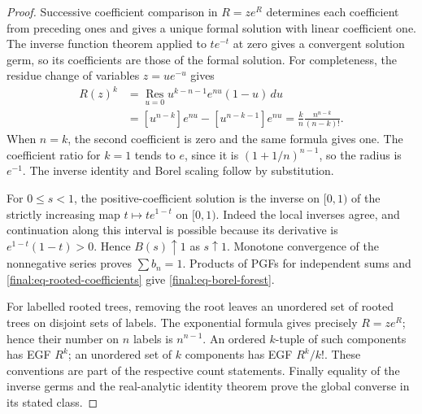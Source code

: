 \begin{proof}
Successive coefficient comparison in $R=ze^R$ determines each
coefficient from preceding ones and gives a unique formal solution
with linear coefficient one.  The inverse function theorem applied
to $t e^{-t}$ at zero gives a convergent solution germ, so its
coefficients are those of the formal solution.  For completeness,
the residue change of variables $z=u e^{-u}$ gives
\begin{align*}
 [z^n]R(z)^k
 &=\operatorname*{Res}_{u=0}
       u^{k-n-1}e^{nu}(1-u)\,du\\
 &=[u^{n-k}]e^{nu}-[u^{n-k-1}]e^{nu}
 =\frac{k}{n}\frac{n^{n-k}}{(n-k)!}.
\end{align*}
When $n=k$, the second coefficient is zero and the same formula
gives one.  The coefficient ratio for $k=1$ tends to $e$,
since it is $(1+1/n)^{n-1}$, so the radius is $e^{-1}$.
The inverse identity and Borel scaling follow by substitution.

For $0\leq s<1$, the positive-coefficient solution is the inverse
on $[0,1)$ of the strictly increasing map
$t\mapsto t e^{1-t}$ on $[0,1)$.  Indeed the local inverses agree,
and continuation along this interval is possible because its
derivative is $e^{1-t}(1-t)>0$.  Hence $B(s)\uparrow1$ as
$s\uparrow1$.  Monotone convergence of the nonnegative series
proves $\sum b_n=1$.  Products of PGFs for independent sums and
\eqref{final:eq-rooted-coefficients} give
\eqref{final:eq-borel-forest}.

For labelled rooted trees, removing the root leaves an unordered
set of rooted trees on disjoint sets of labels.  The exponential
formula gives precisely $R=ze^R$; hence their number on $n$ labels
is $n^{n-1}$.  An ordered $k$-tuple of such components has EGF
$R^k$; an unordered set of $k$ components has EGF $R^k/k!$.
These conventions are part of the respective count statements.
Finally equality of the inverse germs and the real-analytic
identity theorem prove the global converse in its stated class.
\end{proof}

